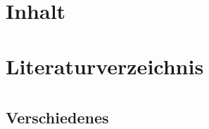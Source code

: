 \documentclass[a4paper,titlepage,12pt]{article}
\title{\thetitle}
\author{\theauthor}
\date{\thedate}
\begin{document}
    \maketitle

    \section{\abstractname}

    \newpage
    \tableofcontents

    \newpage
    \section{Inhalt}

    \newpage
    \appendix
    
    \section{Literaturverzeichnis}
    \printbibliography[title={}]

    \section{\appendixname}
        \subsection{Verschiedenes}

        \newpage
        \glsaddall
        \printglossaries
\end{document}
